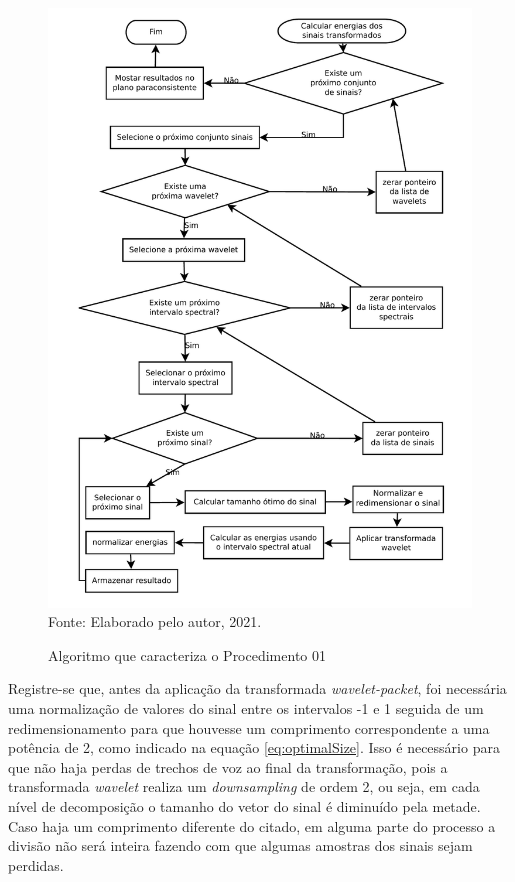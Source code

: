 		\begin{figure}[H]
			\centering
			\caption{Algoritmo que caracteriza o Procedimento 01}
			\includegraphics[width=1\linewidth]{images/AlgoProcedure01.pdf}
			\label{fig:experiment01Algo}
			\\Fonte: Elaborado pelo autor, 2021.
		\end{figure}
		
		\par Registre-se que, antes da aplicação da transformada \textit{wavelet-packet}, foi necessária uma normalização de valores do sinal entre os intervalos -1 e 1 seguida de um redimensionamento para que houvesse um comprimento correspondente a uma potência de 2, como indicado na equação \ref{eq:optimalSize}. Isso é necessário para que não haja perdas de trechos de voz ao final da transformação, pois a transformada \textit{wavelet} realiza um \textit{downsampling} de ordem 2, ou seja, em cada nível de decomposição o tamanho do vetor do sinal é diminuído pela metade. Caso haja um comprimento diferente do citado, em alguma parte do processo a divisão não será inteira fazendo com que algumas amostras dos sinais sejam perdidas.
				

